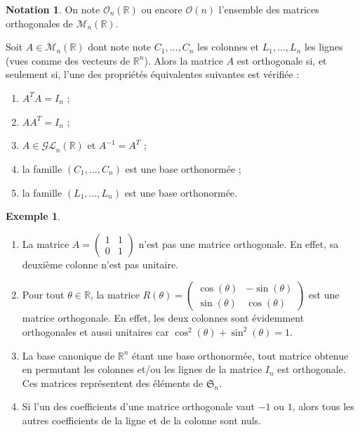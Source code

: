 \documentclass[french]{article}
\newcommand{\R}{\mathbb{R}}
\newcommand{\inv}{^{-1}}
\theoremstyle{plain}
\theoremstyle{definition}
\newtheorem*{ex}{Exemple}
\newtheorem*{notation}{Notation}
\theoremstyle{remark}
\begin{document}
\begin{notation}
	On note $\mathcal{O}_n(\R)$ ou encore $\mathcal{O}(n)$ l'ensemble des matrices orthogonales de $\mathcal{M}_n(\R)$.
\end{notation}

\begin{prop}
	Soit $A\in\mathcal{M}_n(\R)$ dont note note $C_1,\ldots,C_n$ les colonnes et $L_1,\ldots,L_n$ les lignes (vues comme des vecteurs de $\R^n$). Alors la matrice $A$ est orthogonale si, et seulement si, l'une des propriétés équivalentes suivantes est vérifiée :
	\begin{enumerate}[label=(\roman*)]
		\item $A^TA=I_n$ ;
		\item $AA^T=I_n$ ;
		\item $A\in\mathcal{GL}_n(\R)$ et $A\inv=A^T$ ;
		\item la famille $(C_1,\ldots,C_n)$ est une base orthonormée ;
		\item la famille $(L_1,\ldots,L_n)$ est une base orthonormée.
	\end{enumerate}
\end{prop}

\begin{ex}
	\begin{enumerate}
		\item La matrice $A=\displaystyle\begin{pmatrix}
			1&1\\
			0&1
		\end{pmatrix}$ n'est pas une matrice orthogonale. En effet, sa deuxième colonne n'est pas unitaire.
		\item Pour tout $\theta\in\R$, la matrice $R(\theta)=\displaystyle\begin{pmatrix}
			\cos(\theta)&-\sin(\theta)\\
			\sin(\theta)&\cos(\theta)
		\end{pmatrix}$ est une matrice orthogonale. En effet, les deux colonnes sont évidemment orthogonales et aussi unitaires car $\cos^2(\theta)+\sin^2(\theta)=1$.
		\item La base canonique de $\R^n$ étant une base orthonormée, tout matrice obtenue en permutant les colonnes et/ou les lignes de la matrice $I_n$ est orthogonale. Ces matrices représentent des éléments de $\mathfrak{S}_n$.
		\item Si l'un des coefficients d'une matrice orthogonale vaut $-1$ ou $1$, alors tous les autres coefficients de la ligne et de la colonne sont nuls.
	\end{enumerate}
\end{ex}
\end{document}
